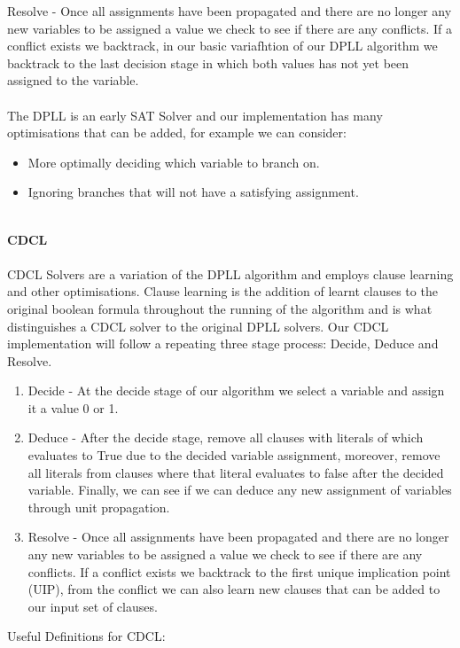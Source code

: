 \documentclass[12pt,a4paper]{article}
\begin{document}
Resolve - Once all assignments have been propagated and there are no longer any new variables to be assigned a value we check to see if there are any conflicts. If a conflict exists we backtrack, in our basic variafhtion of our DPLL algorithm we backtrack to the last decision stage in which both values has not yet been assigned to the variable.\\\\
The DPLL is an early SAT Solver and our implementation has many optimisations that can be added, for example we can consider: 
\begin{itemize}
	\item{More optimally deciding which variable to branch on.}
	\item{Ignoring branches that will not have a satisfying assignment.}
\end{itemize}
\hfill\\
{\bf CDCL}\\\\
CDCL Solvers are a variation of the DPLL algorithm and employs clause learning and other optimisations. Clause learning is the addition of learnt clauses to the original boolean formula throughout the running of the algorithm and is what distinguishes a CDCL solver to the original DPLL solvers. Our CDCL implementation will follow a repeating three stage process: Decide, Deduce and Resolve. 
\begin{enumerate}
	\item{Decide - At the decide stage of our algorithm we select a variable and assign it a value 0 or 1.}
	\item{Deduce - After the decide stage, remove all clauses with literals of which evaluates to True due to the decided variable assignment, moreover, remove all literals from clauses where that literal evaluates to false after the decided variable. Finally, we can see if we can deduce any new assignment of variables through unit propagation.}
	\item{Resolve - Once all assignments have been propagated and there are no longer any new variables to be assigned a value we check to see if there are any conflicts. If a conflict exists we backtrack to the first unique implication point (UIP), from the conflict we can also learn new clauses that can be added to our input set of clauses.}
\end{enumerate}
Useful Definitions \cite[p.132]{CDCL} for CDCL:
\end{document}
